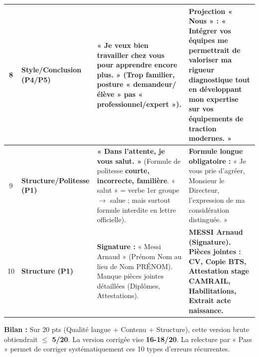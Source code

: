 \documentclass[11pt]{article}
\begin{document}
\begin{exoresolu}
\begin{center}
\begin{tabularx}{\linewidth}{|c|l|X|X|}
8 & \textbf{Style/Conclusion (P4/P5)} & \textbf{« Je veux bien travailler chez vous pour apprendre encore plus. »} (Trop familier, posture « demandeur/élève » pas « professionnel/expert »). & \textbf{Projection « Nous » :} « Intégrer vos équipes me permettrait de valoriser ma rigueur diagnostique tout en développant mon expertise sur vos équipements de traction modernes. » \\ \hline
9 & \textbf{Structure/Politesse (P1)} & \textbf{« Dans l'attente, je vous salut. »} (Formule de politesse \textbf{courte, incorrecte, familière}. « salut » = verbe 1er groupe $\rightarrow$ salue ; mais surtout formule interdite en lettre officielle). & \textbf{Formule longue obligatoire :} « Je vous prie d'agréer, Monsieur le Directeur, l'expression de ma considération distinguée. » \\ \hline
10 & \textbf{Structure (P1)} & \textbf{Signature :} « Messi Arnaud » (Prénom Nom au lieu de Nom PRÉNOM). Manque pièces jointes détaillées (Diplômes, Attestations). & \textbf{MESSI Arnaud (Signature). Pièces jointes : CV, Copie BTS, Attestation stage CAMRAIL, Habilitations, Extrait acte naissance.} \\ \hline
\end{tabularx}
\end{center}

\textbf{Bilan :} Sur 20 pts (Qualité langue + Contenu + Structure), cette version brute obtiendrait \textbf{$\le$ 5/20}. La version corrigée vise \textbf{16-18/20}. La relecture par « Pass » permet de corriger systématiquement ces 10 types d'erreurs récurrentes.
\end{exoresolu}
\end{document}
